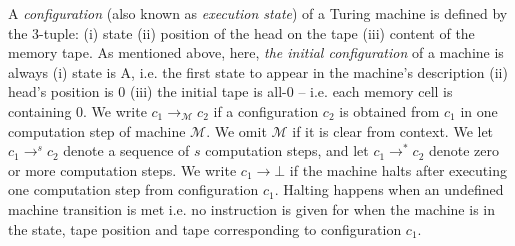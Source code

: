 \documentclass[a4paper,british]{article}
\theoremstyle{definition} %
\numberwithin{equation}{section}
\theoremstyle{definition} %
\newcommand{\lhead}[1]{\stackrel{#1}\triangleleft}
\newcommand{\rhead}[1]{\stackrel{#1}\triangleright}
\newcommand{\TMstep}{\to}
\begin{document}
A \textit{configuration} (also known as \textit{execution state}) of a Turing machine is defined by the 3-tuple: (i) state (ii) position of the head on the tape (iii) content of the memory tape. As mentioned above, here, \textit{the initial configuration} of a machine is always (i) state is A, i.e. the first state to appear in the machine's description (ii) head's position is 0 (iii) the initial tape is all-0 -- i.e. each memory cell is containing 0. We write $c_1 \TMstep_\mathcal{M} c_2$ if a configuration $c_2$ is obtained from $c_1$ in one computation step of machine $\mathcal{M}$. We omit $\mathcal{M}$ if it is clear from context. We let $c_1 \TMstep^s c_2$ denote a sequence of $s$ computation steps, and let $c_1 \TMstep^* c_2$ denote zero or more computation steps. %
We write $c_1 \TMstep \bot$ if the machine halts after executing one computation step from configuration $c_1$. Halting happens when an undefined machine transition is met i.e. no instruction is given for when the machine is in the state, tape position and tape corresponding to configuration $c_1$.


\end{document}
